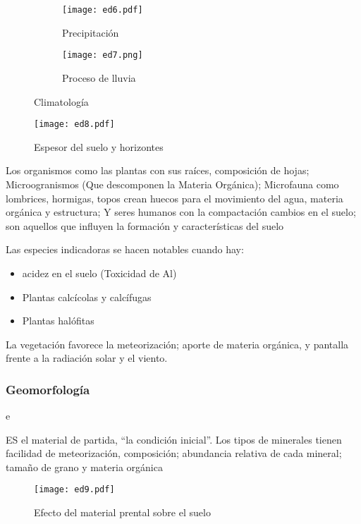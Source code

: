 \begin{figure}[h!]
    \centering
    \begin{subfigure}[b]{0.45\linewidth}
    \texttt{[image: ed6.pdf]}
    \caption{Precipitación}
    \label{ed6}
    \end{subfigure}
    \begin{subfigure}[b]{0.45\linewidth}
    \texttt{[image: ed7.png]}
    \caption{Proceso de lluvia}
    \label{ed7}
    \end{subfigure}
    \caption{Climatología}
    \label{ed6-7}
\end{figure}

\begin{figure}[h!]
\centering
  \texttt{[image: ed8.pdf]}
  \caption{Espesor del suelo y horizontes}
  \label{ed8}
\end{figure}
Los organismos como las plantas con sus raíces, composición de hojas; Microogranismos (Que descomponen la Materia Orgánica); Microfauna como lombrices, hormigas, topos crean huecos para el movimiento del agua, materia orgánica y estructura; Y seres humanos con la compactación cambios en el suelo; son aquellos que influyen la formación y características del suelo

Las especies indicadoras se hacen notables cuando hay:
\begin{itemize}
    \item acidez en el suelo (Toxicidad de Al)
    \item Plantas calcícolas y calcífugas
    \item Plantas halófitas
\end{itemize}
La vegetación favorece la meteorización; aporte de materia orgánica, y pantalla frente a la radiación solar y el viento.

\subsubsection{Geomorfología}

e\begin{definition}
    ES el material de partida, ``la condición inicial''. Los tipos de minerales tienen facilidad de meteorización, composición; abundancia relativa de cada mineral; tamaño de grano y materia orgánica
\end{definition}
\begin{figure}[h!]
\centering
  \texttt{[image: ed9.pdf]}
  \caption{Efecto del material prental sobre el suelo}
  \label{ed9}
\end{figure}

